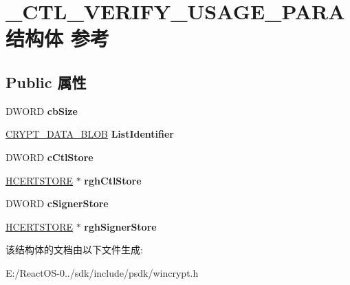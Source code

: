 \hypertarget{struct___c_t_l___v_e_r_i_f_y___u_s_a_g_e___p_a_r_a}{}\section{\+\_\+\+C\+T\+L\+\_\+\+V\+E\+R\+I\+F\+Y\+\_\+\+U\+S\+A\+G\+E\+\_\+\+P\+A\+R\+A结构体 参考}
\label{struct___c_t_l___v_e_r_i_f_y___u_s_a_g_e___p_a_r_a}
\subsection*{Public 属性}
\begin{DoxyCompactItemize}
\item 
\mbox{\label{struct___c_t_l___v_e_r_i_f_y___u_s_a_g_e___p_a_r_a_af8724b0005229864b3282ad9bb70e4be}} 
D\+W\+O\+RD {\bfseries cb\+Size}
\item 
\mbox{\label{struct___c_t_l___v_e_r_i_f_y___u_s_a_g_e___p_a_r_a_a509ba7306d889225bf81a9cbfb3cb112}} 
\hyperlink{struct___c_r_y_p_t_o_a_p_i___b_l_o_b}{C\+R\+Y\+P\+T\+\_\+\+D\+A\+T\+A\+\_\+\+B\+L\+OB} {\bfseries List\+Identifier}
\item 
\mbox{\label{struct___c_t_l___v_e_r_i_f_y___u_s_a_g_e___p_a_r_a_ab58629570c7c2d5ea3a4903ace512aee}} 
D\+W\+O\+RD {\bfseries c\+Ctl\+Store}
\item 
\mbox{\label{struct___c_t_l___v_e_r_i_f_y___u_s_a_g_e___p_a_r_a_a116e460c1927875f494d8710a0bfe187}} 
\hyperlink{interfacevoid}{H\+C\+E\+R\+T\+S\+T\+O\+RE} $\ast$ {\bfseries rgh\+Ctl\+Store}
\item 
\mbox{\label{struct___c_t_l___v_e_r_i_f_y___u_s_a_g_e___p_a_r_a_a822d78442291f7abf604e6dcc4f5b122}} 
D\+W\+O\+RD {\bfseries c\+Signer\+Store}
\item 
\mbox{\label{struct___c_t_l___v_e_r_i_f_y___u_s_a_g_e___p_a_r_a_a69e4c35aeeb68ac3d8a8869879317222}} 
\hyperlink{interfacevoid}{H\+C\+E\+R\+T\+S\+T\+O\+RE} $\ast$ {\bfseries rgh\+Signer\+Store}
\end{DoxyCompactItemize}


该结构体的文档由以下文件生成\+:\begin{DoxyCompactItemize}
\item 
E\+:/\+React\+O\+S-\/0../sdk/include/psdk/wincrypt.\+h\end{DoxyCompactItemize}
